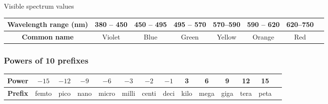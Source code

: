 \documentclass[11pt]{paper}
\begin{document}
Visible spectrum values
\begin{tabular}{|c|c|c|c|c|c|c|c|}
\hline
\textbf{Wavelength range (nm)} & 380 \--- 450 & 450 \--- 495 & 495 \--- 570 & 570\---590 & 590 \--- 620 & 620\---750 \\ \hline
\textbf{Common name} & Violet & Blue & Green & Yellow & Orange & Red  \\ \hline
\end{tabular}

\bigskip
\bigskip
\bigskip
\bigskip

\newpage
\subsubsection*{Powers of 10 prefixes}
\label{subsec:pow}
\begin{tabular}{|c|c|c|c|c|c|c|c|c|c|c|c|c|c|}
\hline
\textbf{Power} & $-15$ & $-12$ & $-9$ & $-6$ & $-3$ & $-2$ & $-1$ & 3 & 6 & 9 & 12 & 15\\ \hline
\textbf{Prefix} & femto & pico & nano & micro & milli & centi & deci & kilo & mega & giga & tera & peta\\ \hline
\end{tabular}
\end{document}
